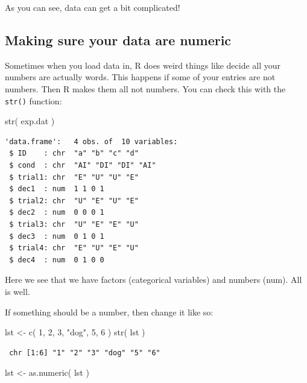 \documentclass[
  letterpaper,
  DIV=11,
  numbers=noendperiod]{scrreprt}
\newenvironment{Shaded}{\begin{snugshade}}{\end{snugshade}}
\newcommand{\DecValTok}[1]{\textcolor[rgb]{0.25,0.63,0.44}{#1}}
\newcommand{\FunctionTok}[1]{\textcolor[rgb]{0.02,0.16,0.49}{#1}}
\newcommand{\NormalTok}[1]{\textcolor[rgb]{0.00,0.44,0.13}{#1}}
\newcommand{\OtherTok}[1]{\textcolor[rgb]{0.00,0.44,0.13}{#1}}
\newcommand{\StringTok}[1]{\textcolor[rgb]{0.25,0.44,0.63}{#1}}
\begin{document}
As you can see, data can get a bit complicated!

\hypertarget{making-sure-your-data-are-numeric}{%
\subsection{Making sure your data are
numeric}\label{making-sure-your-data-are-numeric}}

Sometimes when you load data in, R does weird things like decide all
your numbers are actually words. This happens if some of your entries
are not numbers. Then R makes them all not numbers. You can check this
with the \texttt{str()} function:

\begin{Shaded}
\begin{Highlighting}[]
\FunctionTok{str}\NormalTok{( exp.dat )}
\end{Highlighting}
\end{Shaded}

\begin{verbatim}
'data.frame':   4 obs. of  10 variables:
 $ ID    : chr  "a" "b" "c" "d"
 $ cond  : chr  "AI" "DI" "DI" "AI"
 $ trial1: chr  "E" "U" "U" "E"
 $ dec1  : num  1 1 0 1
 $ trial2: chr  "U" "E" "U" "E"
 $ dec2  : num  0 0 0 1
 $ trial3: chr  "U" "E" "E" "U"
 $ dec3  : num  0 1 0 1
 $ trial4: chr  "E" "U" "E" "U"
 $ dec4  : num  0 1 0 0
\end{verbatim}

Here we see that we have factors (categorical variables) and numbers
(num). All is well.

If something should be a number, then change it like so:

\begin{Shaded}
\begin{Highlighting}[]
\NormalTok{lst }\OtherTok{\textless{}{-}}  \FunctionTok{c}\NormalTok{( }\DecValTok{1}\NormalTok{, }\DecValTok{2}\NormalTok{, }\DecValTok{3}\NormalTok{, }\StringTok{"dog"}\NormalTok{, }\DecValTok{5}\NormalTok{, }\DecValTok{6}\NormalTok{ )}
\FunctionTok{str}\NormalTok{( lst )}
\end{Highlighting}
\end{Shaded}

\begin{verbatim}
 chr [1:6] "1" "2" "3" "dog" "5" "6"
\end{verbatim}

\begin{Shaded}
\begin{Highlighting}[]
\NormalTok{lst }\OtherTok{\textless{}{-}} \FunctionTok{as.numeric}\NormalTok{( lst )}
\end{Highlighting}
\end{Shaded}
\end{document}
